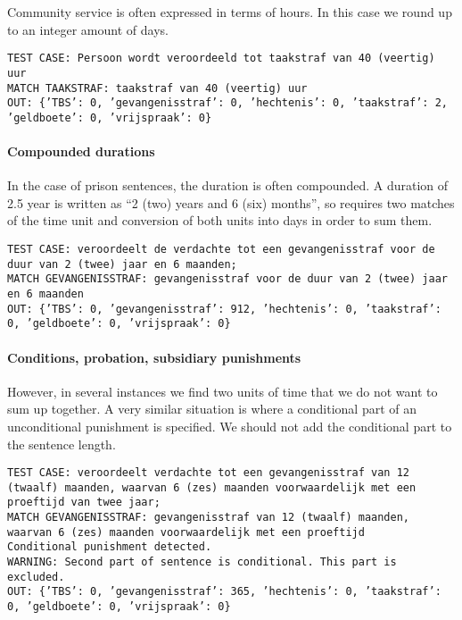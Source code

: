 \documentclass[a4paper]{article}
\begin{document}
Community service is often expressed in terms of hours.
In this case we round up to an integer amount of days.

\texttt{TEST CASE: %
Persoon wordt veroordeeld tot taakstraf van 40 (veertig) uur\\
MATCH TAAKSTRAF: taakstraf van 40 (veertig) uur\\
OUT: \{'TBS': 0, 'gevangenisstraf': 0, 'hechtenis': 0, 'taakstraf': 2, 'geldboete': 0, 'vrijspraak': 0\}}

\paragraph{Compounded durations}

In the case of prison sentences, the duration is often compounded.
A duration of 2.5 year is written as ``2 (two) years and 6 (six) months'', so requires two matches of the time unit and conversion of both units into days in order to sum them.

\texttt{TEST CASE: %
veroordeelt de verdachte tot een gevangenisstraf voor de duur van 2 (twee) jaar en 6 maanden;\\
MATCH GEVANGENISSTRAF: gevangenisstraf voor de duur van 2 (twee) jaar en 6 maanden\\
OUT: \{'TBS': 0, 'gevangenisstraf': 912, 'hechtenis': 0, 'taakstraf': 0, 'geldboete': 0, 'vrijspraak': 0\}}

\paragraph{Conditions, probation, subsidiary punishments}

However, in several instances we find two units of time that we do not want to sum up together.
A very similar situation is where a conditional part of an unconditional punishment is specified.
We should not add the conditional part to the sentence length.

\texttt{TEST CASE: %
veroordeelt verdachte tot een gevangenisstraf van 12 (twaalf) maanden, waarvan  6 (zes) maanden voorwaardelijk met een proeftijd van twee jaar;\\
MATCH GEVANGENISSTRAF: gevangenisstraf van 12 (twaalf) maanden, waarvan  6 (zes) maanden voorwaardelijk met een proeftijd\\
Conditional punishment detected.\\
WARNING: Second part of sentence is conditional. This part is excluded.\\
OUT: \{'TBS': 0, 'gevangenisstraf': 365, 'hechtenis': 0, 'taakstraf': 0, 'geldboete': 0, 'vrijspraak': 0\}}
\end{document}
